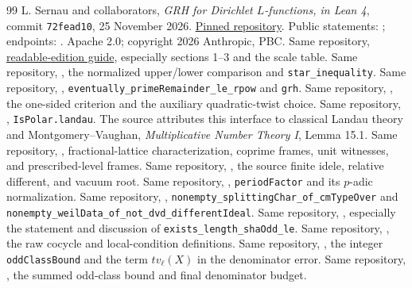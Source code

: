 \begin{thebibliography}{99}
 L. Sernau and collaborators, \emph{GRH for Dirichlet $L$-functions, in Lean 4}, commit \texttt{72fead10}, 25 November 2026. \href{https://github.com/lsernau/grh-lean/tree/72fead102f663d5c7a407964a13dc0cf9d977207}{Pinned repository}. Public statements: ; endpoints: . Apache 2.0; copyright 2026 Anthropic, PBC.
 Same repository, \href{https://github.com/lsernau/grh-lean/blob/72fead102f663d5c7a407964a13dc0cf9d977207/grh/GUIDE.md}{readable-edition guide}, especially sections 1--3 and the scale table.
 Same repository, , the normalized upper/lower comparison and \texttt{star\_inequality}.
 Same repository, , \texttt{eventually\_primeRemainder\_le\_rpow} and \texttt{grh}.
 Same repository, , the one-sided criterion and the auxiliary quadratic-twist choice.
 Same repository, , \texttt{IsPolar.landau}. The source attributes this interface to classical Landau theory and Montgomery--Vaughan, \emph{Multiplicative Number Theory I}, Lemma 15.1.
 Same repository, , fractional-lattice characterization, coprime frames, unit witnesses, and prescribed-level frames.
 Same repository, , the source finite idele, relative different, and vacuum root.
 Same repository, , \texttt{periodFactor} and its $p$-adic normalization.
 Same repository, , \texttt{nonempty\_splittingChar\_of\_cmTypeOver} and \texttt{nonempty\_weilData\_of\_not\_dvd\_differentIdeal}.
 Same repository, , especially the statement and discussion of \texttt{exists\_length\_shaOdd\_le}.
 Same repository, , the raw cocycle and local-condition definitions.
 Same repository, , the integer \texttt{oddClassBound} and the term $t v_\ell(X)$ in the denominator error.
 Same repository, , the summed odd-class bound and final denominator budget.

\end{thebibliography}
